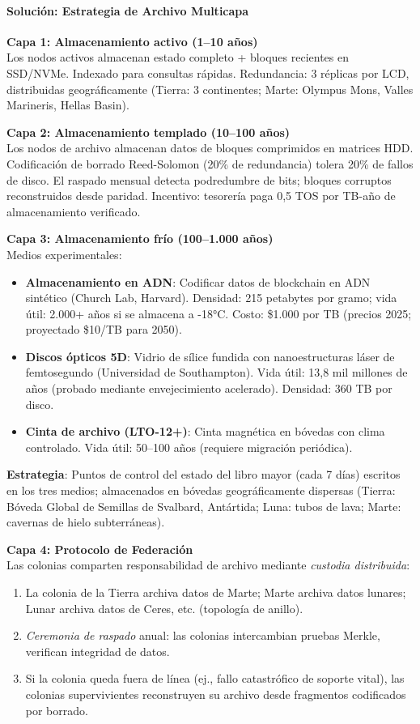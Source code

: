 \documentclass[11pt]{article}
\begin{document}
\paragraph{Solución: Estrategia de Archivo Multicapa}

\textbf{Capa 1: Almacenamiento activo (1--10 años)}\\
Los nodos activos almacenan estado completo + bloques recientes en SSD/NVMe. Indexado para consultas rápidas. Redundancia: 3 réplicas por LCD, distribuidas geográficamente (Tierra: 3 continentes; Marte: Olympus Mons, Valles Marineris, Hellas Basin).

\textbf{Capa 2: Almacenamiento templado (10--100 años)}\\
Los nodos de archivo almacenan datos de bloques comprimidos en matrices HDD. Codificación de borrado Reed-Solomon (20\% de redundancia) tolera 20\% de fallos de disco. El raspado mensual detecta podredumbre de bits; bloques corruptos reconstruidos desde paridad. Incentivo: tesorería paga 0,5 TOS por TB-año de almacenamiento verificado.

\textbf{Capa 3: Almacenamiento frío (100--1.000 años)}\\
Medios experimentales:
\begin{itemize}[noitemsep]
  \item \textbf{Almacenamiento en ADN}: Codificar datos de blockchain en ADN sintético (Church Lab, Harvard). Densidad: 215 petabytes por gramo; vida útil: 2.000+ años si se almacena a -18°C. Costo: \$1.000 por TB (precios 2025; proyectado \$10/TB para 2050).
  \item \textbf{Discos ópticos 5D}: Vidrio de sílice fundida con nanoestructuras láser de femtosegundo (Universidad de Southampton). Vida útil: 13,8 mil millones de años (probado mediante envejecimiento acelerado). Densidad: 360 TB por disco.
  \item \textbf{Cinta de archivo (LTO-12+)}: Cinta magnética en bóvedas con clima controlado. Vida útil: 50--100 años (requiere migración periódica).
\end{itemize}
\textbf{Estrategia}: Puntos de control del estado del libro mayor (cada 7 días) escritos en los tres medios; almacenados en bóvedas geográficamente dispersas (Tierra: Bóveda Global de Semillas de Svalbard, Antártida; Luna: tubos de lava; Marte: cavernas de hielo subterráneas).

\textbf{Capa 4: Protocolo de Federación}\\
Las colonias comparten responsabilidad de archivo mediante \emph{custodia distribuida}:
\begin{enumerate}[noitemsep]
  \item La colonia de la Tierra archiva datos de Marte; Marte archiva datos lunares; Lunar archiva datos de Ceres, etc. (topología de anillo).
  \item \emph{Ceremonia de raspado} anual: las colonias intercambian pruebas Merkle, verifican integridad de datos.
  \item Si la colonia queda fuera de línea (ej., fallo catastrófico de soporte vital), las colonias supervivientes reconstruyen su archivo desde fragmentos codificados por borrado.
\end{enumerate}
\end{document}
